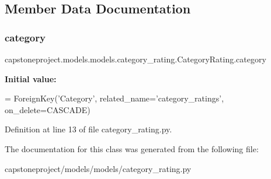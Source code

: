 \subsection{Member Data Documentation}
\mbox{\label{classcapstoneproject_1_1models_1_1models_1_1category__rating_1_1_category_rating_a55295da26f8c3412db694fe73286fa30}} 
\subsubsection{\texorpdfstring{category}{category}}
{\footnotesize\ttfamily capstoneproject.\+models.\+models.\+category\+\_\+rating.\+Category\+Rating.\+category\hspace{0.3cm}{\ttfamily [static]}}

{\bfseries Initial value\+:}
\begin{DoxyCode}
=  ForeignKey(\textcolor{stringliteral}{'Category'}, related\_name=\textcolor{stringliteral}{'category\_ratings'},
                          on\_delete=CASCADE)
\end{DoxyCode}


Definition at line 13 of file category\+\_\+rating.\+py.



The documentation for this class was generated from the following file\+:\begin{DoxyCompactItemize}
\item 
capstoneproject/models/models/category\+\_\+rating.\+py\end{DoxyCompactItemize}
